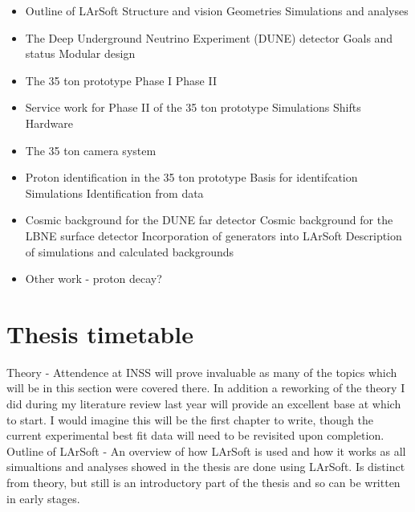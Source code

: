 \documentclass[11pt]{report} %
\begin{document}
{\begin{itemize}
\item Outline of LArSoft
  \subitem Structure and vision
  \subitem Geometries
  \subitem Simulations and analyses
  
\item The Deep Underground Neutrino Experiment (DUNE) detector
  \subitem Goals and status
  \subitem Modular design

\item The 35 ton prototype
  \subitem Phase I
  \subitem Phase II 
  
\item Service work for Phase II of the 35 ton prototype
  \subitem Simulations
  \subitem Shifts
  \subitem Hardware
  
\item The 35 ton camera system

\item Proton identification in the 35 ton prototype
  \subitem Basis for identifcation
  \subitem Simulations
  \subitem Identification from data
  
\item Cosmic background for the DUNE far detector
  \subitem Cosmic background for the LBNE surface detector
  \subitem Incorporation of generators into LArSoft
  \subitem Description of simulations and calculated backgrounds

\item Other work - proton decay?
    
\end{itemize}

\section{Thesis timetable}
Theory - Attendence at INSS will prove invaluable as many of the topics which will be in this section were covered there. In addition a reworking of the theory I did during my literature review last year will provide an excellent base at which to start. I would imagine this will be the first chapter to write, though the current experimental best fit data will need to be revisited upon completion.\\

Outline of LArSoft - An overview of how LArSoft is used and how it works as all simualtions and analyses showed in the thesis are done using LArSoft. Is distinct from theory, but still is an introductory part of the thesis and so can be written in early stages. \\

}
\end{document}
